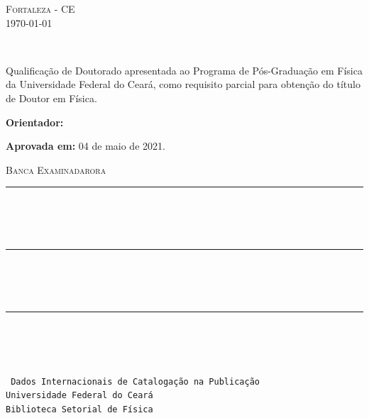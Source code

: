 \begin{center}
	{\large \textsc{Fortaleza - CE}} \\
	\today
\end{center}

\newpage
	
\begin{center}
	{\large \textsc{\autor}}
\end{center}
\vspace{5mm}

{\centering \titulo} \\
\vspace{3mm}

\begin{flushright}
	\begin{minipage}{80mm}
		Qualificação de Doutorado apresentada ao Programa de Pós-Graduação em Física da Universidade Federal do Ceará, como requisito parcial para obtenção do título de Doutor em Física.
		\begin{flushright} \textbf{Orientador:} \orientador \end{flushright}
	\end{minipage}
\end{flushright}
\vspace{5mm}

\begin{flushleft}
	\textbf{Aprovada em:} 04 de maio de 2021.
\end{flushleft} \vspace{5mm}

\begin{center}
	\textsc{Banca Examinadarora} \\ 
	\vspace{10mm}
	\rule{120mm}{0.1mm} \\
	\interno \\
	\instituicaoi \\ 
	\vspace{10mm}
	\rule{120mm}{0.1mm} \\
	\internoii \\
	\instituicaoiii \\ 
	\vspace{10mm}
	\rule{120mm}{0.1mm} \\
	\externo \\
	\instituicaoiiii
\end{center}

\newpage 

\rec 
\vspace{180mm}
\\
\texttt{
	Dados Internacionais de Catalogação na Publicação \\
	Universidade Federal do Ceará \\
	Biblioteca Setorial de Física
}

